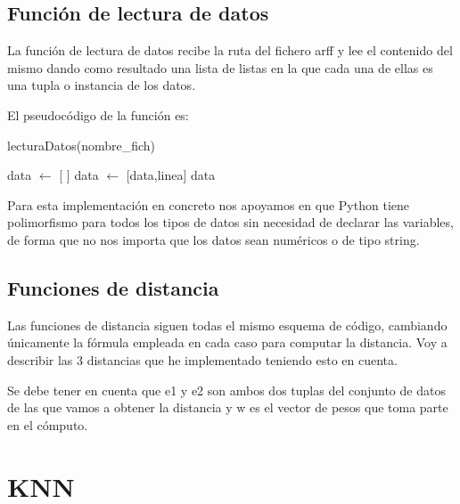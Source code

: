 \documentclass[12pt,a4paper]{article}
\begin{document}
	\subsection{Función de lectura de datos}
	
	La función de lectura de datos recibe la ruta del fichero arff y lee el contenido del mismo dando como resultado una lista de listas en la que cada una de ellas es una tupla o instancia de los datos.
	
	El pseudocódigo de la función es:
	
	\begin{algorithm}
		\caption{lecturaDatos(nombre\_fich)}
		\label{algoritmoLecturaDatos}
		\begin{algorithmic}
			\STATE data $\leftarrow$ [ ]
					\STATE data $\leftarrow$ [data,linea]
				\ENDIF
			\ENDFOR
			\RETURN data
		\end{algorithmic}
	\end{algorithm}
	
	Para esta implementación en concreto nos apoyamos en que Python tiene polimorfismo para todos los tipos de datos sin necesidad de declarar las variables, de forma que no nos importa que los datos sean numéricos o de tipo string.
	
	\subsection{Funciones de distancia}
	
	Las funciones de distancia siguen todas el mismo esquema de código, cambiando únicamente la fórmula empleada en cada caso para computar la distancia. Voy a describir las 3 distancias que he implementado teniendo esto en cuenta.
	
	Se debe tener en cuenta que e1 y e2 son ambos dos tuplas del conjunto de datos de las que vamos a obtener la distancia y w es el vector de pesos que toma parte en el cómputo.
	
	

	\section{KNN}
	\label{sec:knn}
\end{document}
